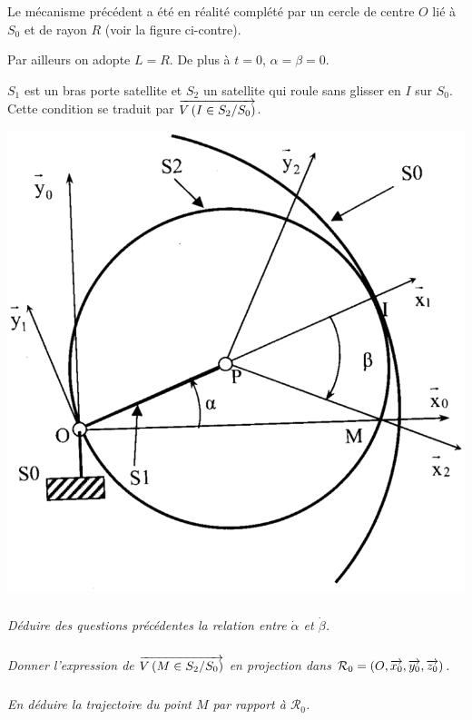 \documentclass[10pt,oneside]{article}
\begin{document}
\begin{minipage}[c]{.4\linewidth}
Le mécanisme précédent a été en réalité complété par un cercle de centre $O$ lié à $S_0$ et de rayon $R$ (voir la figure ci-contre).

 
Par ailleurs on adopte $L = R$. De plus à $t = 0$,  $\alpha=\beta=0$.

$S_1$ est un bras porte satellite et $S_2$ un satellite qui roule sans glisser en $I$ sur $S_0$. Cette condition se traduit par $\overrightarrow{V\left( {I} \in {S_2}/{S_0}\right)}$.

\end{minipage}\hfill
\begin{minipage}[c]{.55\linewidth}
\begin{center}
\includegraphics[width=.95\textwidth]{png/fig3}
\end{center}
\end{minipage}
 

\subparagraph{}
\textit{Déduire des questions précédentes la relation entre $\dot{\alpha}$ et $\dot{\beta}$.}


\subparagraph{}
\textit{Donner l'expression de $\overrightarrow{V\left( {M} \in {S_2}/{S_0}\right)}$ en projection dans $\mathcal{R}_0 = \left(O,\overrightarrow{x_0},\overrightarrow{y_0},\overrightarrow{z_0}\right)$.}

\subparagraph{}
\textit{En déduire la trajectoire du point $M$ par rapport à $\mathcal{R}_0$.}
\end{document}
